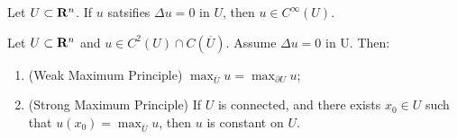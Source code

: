 \begin{corollary}
	Let $U \subset \mathbf{R}^n$. If $u$ satsifies $\Delta u  =0$ in $U$, then $u \in C^\infty(U)$.
\end{corollary}


\begin{theorem}\label{thm:maximum-prince}
	Let $U \subset \mathbf{R}^n$ and $u \in C^2(U) \cap C(\overline{U})$. Assume $\Delta u = 0$ in U. Then:
	\begin{enumerate}[label = (\alph*),itemsep=1pt,topsep=3pt]
		\item (Weak Maximum Principle) $\max_{\overline{U}} u = \max_{\partial U} u $;
		\item (Strong Maximum Principle) If $U$ is connected, and there exists $x_0 \in U$ such that $u(x_0) = \max_{\overline{U}}u$, then $u$ is constant on $U$.
	\end{enumerate}
\end{theorem}
